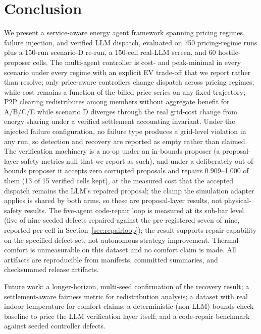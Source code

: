 \documentclass[11pt,a4paper]{article}
\begin{document}
\section{Conclusion}
\label{sec:conclusion}

We present a service-aware energy agent framework spanning pricing regimes,
failure injection, and verified LLM dispatch, evaluated on 750
pricing-regime runs plus a 150-run scenario-D re-run, a 150-cell real-LLM
screen, and 60 hostile-proposer cells. The multi-agent controller is
cost- and peak-minimal in every scenario under every regime with an explicit
EV trade-off that we report rather than resolve; only price-aware controllers
change dispatch across pricing regimes, while cost remains a function of the
billed price series on any fixed trajectory; P2P clearing redistributes
among members without aggregate benefit for A/B/C/E while scenario D diverges
through the real grid-cost change from energy sharing under a verified
settlement accounting invariant. Under the injected failure configuration, no
failure type produces a grid-level violation in any run, so detection and
recovery are reported as empty rather than claimed. The verification machinery
is a no-op under an in-bounds proposer (a proposal-layer safety-metrics null
that we report as such), and under a deliberately out-of-bounds proposer it
accepts zero corrupted proposals and repairs 0.909--1.000 of them (13 of 15
verified cells kept), at the measured cost that
the accepted dispatch remains the LLM's repaired proposal; the clamp the
simulation adapter applies is shared by both arms, so these are
proposal-layer results, not physical-safety results. The five-agent code-repair
loop is measured at its sub-bar level (five of nine seeded defects repaired
against the pre-registered seven of nine, reported per cell in
Section~\ref{sec:repairloop}); the result supports repair capability on the
specified defect set, not autonomous strategy improvement. Thermal comfort is
unmeasurable on this dataset and no comfort claim is made. All artifacts are
reproducible from manifests, committed summaries, and checksummed release
artifacts.

Future work: a longer-horizon, multi-seed confirmation of the recovery result;
a settlement-aware fairness metric for redistribution analysis; a dataset with
real indoor temperature for comfort claims; a deterministic (non-LLM)
bounds-check baseline to price the LLM verification layer itself; and a
code-repair benchmark against seeded controller defects.
\end{document}
